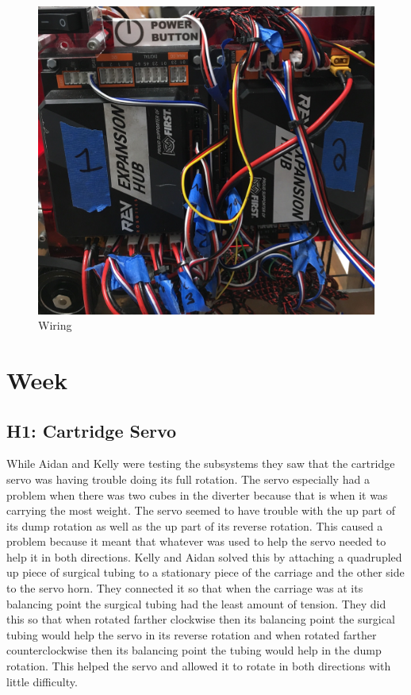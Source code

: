 \documentclass{article}
\begin{document}
\begin{figure}
    \centering
    \includegraphics[width=.6 \textwidth]{20_01-14/images/wiring.jpg}
    \caption{Wiring}
    \label{fig:wiring}
\end{figure}
\clearpage \newpage \section{Week \thesection} 
\subsection{H1: Cartridge Servo}

While Aidan and Kelly were testing the subsystems they saw that the cartridge servo was having trouble doing its full rotation. The servo especially had a problem when there was two cubes in the diverter because that is when it was carrying the most weight. The servo seemed to have trouble with the up part of its dump rotation as well as the up part of its reverse rotation. This caused a problem because it meant that whatever was used to help the servo needed to help it in both directions. Kelly and Aidan solved this by attaching a quadrupled up piece of surgical tubing to a stationary piece of the carriage and the other side to the servo horn. They connected it so that when the carriage was at its balancing point the surgical tubing had the least amount of tension. They did this so that when rotated farther clockwise then its balancing point the surgical tubing would help the servo in its reverse rotation and when rotated farther counterclockwise then its balancing point the tubing would help in the dump rotation. This helped the servo and allowed it to rotate in both directions with little difficulty.
\end{document}
